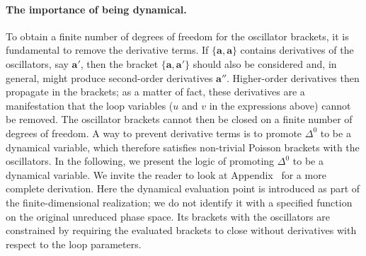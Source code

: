 \paragraph{The importance of being dynamical.}

To obtain a finite number of degrees of freedom for the oscillator brackets, it is fundamental to remove the derivative terms. If $\{\mathbf{a}, \mathbf{a}\}$ contains derivatives of the oscillators, say $\mathbf{a}'$, then the bracket $\{\mathbf{a}, \mathbf{a}'\}$ should also be considered and, in general, might produce second-order derivatives $\mathbf{a}''$. Higher-order derivatives then propagate in the brackets; as a matter of fact, these derivatives are a manifestation that the loop variables ($u$ and $v$ in the expressions above) cannot be removed. The oscillator brackets cannot then be closed on a finite number of degrees of freedom. A way to prevent derivative terms is to promote $\Delta^0$ to be a dynamical variable, which therefore satisfies non-trivial Poisson brackets with the oscillators. In the following, we present the logic of promoting $\Delta^0$ to be a dynamical variable. We invite the reader to look at Appendix~ for a more complete derivation.
Here the dynamical evaluation point is introduced as part of the
finite-dimensional realization; we do not identify it with a specified
function on the original unreduced phase space. Its brackets with the
oscillators are constrained by requiring the evaluated brackets to close
without derivatives with respect to the loop parameters.

